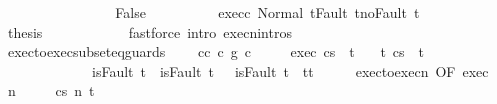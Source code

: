 \begin{isabellebody}
\ \ \ \ \ \ \isamarkupfalse%
\isanewline
\ \ \ \ \ \ \ \ \isamarkupfalse%
\ False\isanewline
\ \ \ \ \ \ \ \ \isamarkupfalse%
\ exec{\isacharunderscore}c{}{\isacharprime}\ Normal\ t{\isacharunderscore}Fault\ t{\isacharprime}{\isacharunderscore}noFault\ t\isanewline
\ \ \ \ \ \ \ \ \isamarkupfalse%
\ {\isacharquery}thesis\isanewline
\ \ \ \ \ \ \ \ \ \ \isamarkupfalse%
\ {\isacharparenleft}fastforce\ intro{\isacharcolon}\ execn{\isachardot}intros{\isacharparenright}\isanewline
\ \ \ \ \ \ \isamarkupfalse%
\isanewline
\ \ \ \ \isamarkupfalse%
\isanewline
\ \ \isamarkupfalse%
\isanewline
{}\isamarkupfalse%
%
\endisatagproof
{\isafoldproof}%
%
\isadelimproof
\isanewline
%
\endisadelimproof
\isanewline
{}\isamarkupfalse%
\ exec{\isacharunderscore}to{\isacharunderscore}exec{\isacharunderscore}subseteq{\isacharunderscore}guards{\isacharcolon}\ \isanewline
\ \ \ c{\isacharunderscore}c{\isacharprime}{\isacharcolon}\ {\isachardoublequoteopen}c\ {\isasymsubseteq}\isactrlsub g\ c{\isacharprime}{\isachardoublequoteclose}\ \isanewline
\ \ \ \ exec{\isacharcolon}\ {\isachardoublequoteopen}{\isasymGamma}{\isasymturnstile}{\isasymlangle}c{\isacharcomma}s{\isasymrangle}\ {\isasymRightarrow}\ t{\isachardoublequoteclose}\isanewline
\ \ \ {\isachardoublequoteopen}{\isasymexists}t{\isacharprime}{\isachardot}\ {\isasymGamma}{\isasymturnstile}{\isasymlangle}c{\isacharprime}{\isacharcomma}s{\isasymrangle}\ {\isasymRightarrow}\ t{\isacharprime}\ {\isasymand}\ \isanewline
\ \ \ \ \ \ \ \ \ \ \ \ \ {\isacharparenleft}isFault\ t\ {\isasymlongrightarrow}\ isFault\ t{\isacharprime}{\isacharparenright}\ {\isasymand}\ {\isacharparenleft}{\isasymnot}\ isFault\ t{\isacharprime}\ {\isasymlongrightarrow}\ t{\isacharprime}{\isacharequal}t{\isacharparenright}{\isachardoublequoteclose}\isanewline
%
\isadelimproof
%
\endisadelimproof
%
\isatagproof
{}\isamarkupfalse%
\ {\isacharminus}\isanewline
\ \ \isamarkupfalse%
\ exec{\isacharunderscore}to{\isacharunderscore}execn\ {\isacharbrackleft}OF\ exec{\isacharbrackright}\ \isamarkupfalse%
\ n\ \isanewline
\ \ \ \ {\isachardoublequoteopen}{\isasymGamma}{\isasymturnstile}{\isasymlangle}c{\isacharcomma}s{\isasymrangle}\ {\isacharequal}n{\isasymRightarrow}\ t{\isachardoublequoteclose}\ \isacommand{{\isachardot}{\isachardot}}\isamarkupfalse%
\isanewline
\ \ \isamarkupfalse%

\end{isabellebody}
